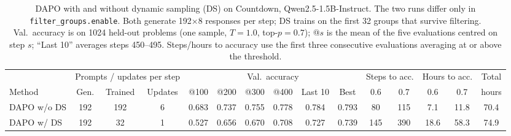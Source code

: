 \begin{table}[t]
\centering
\small
\caption{DAPO with and without dynamic sampling (DS) on Countdown, Qwen2.5-1.5B-Instruct. The two runs differ only in \texttt{filter\_groups.enable}. Both generate 192$\times$8 responses per step; DS trains on the first 32 groups that survive filtering. Val.\ accuracy is on 1024 held-out problems (one sample, $T{=}1.0$, top-$p{=}0.7$); @$s$ is the mean of the five evaluations centred on step $s$; ``Last 10'' averages steps 450--495. Steps/hours to accuracy use the first three consecutive evaluations averaging at or above the threshold.}
\label{tab:ds_vs_nods}
\setlength{\tabcolsep}{4pt}
\begin{tabular}{lcccccccccccccc}
\toprule
& \multicolumn{3}{c}{Prompts / updates per step} & \multicolumn{6}{c}{Val.\ accuracy} & \multicolumn{2}{c}{Steps to acc.} & \multicolumn{2}{c}{Hours to acc.} & Total \\
Method & Gen. & Trained & Updates & @100 & @200 & @300 & @400 & Last 10 & Best & 0.6 & 0.7 & 0.6 & 0.7 & hours \\
\midrule
DAPO w/o DS & 192 & 192 & 6 & 0.683 & 0.737 & 0.755 & 0.778 & 0.784 & 0.793 & 80 & 115 & 7.1 & 11.8 & 70.4 \\
DAPO w/ DS & 192 & 32 & 1 & 0.527 & 0.656 & 0.670 & 0.708 & 0.727 & 0.739 & 145 & 390 & 18.6 & 58.3 & 74.9 \\
\bottomrule
\end{tabular}
\end{table}
